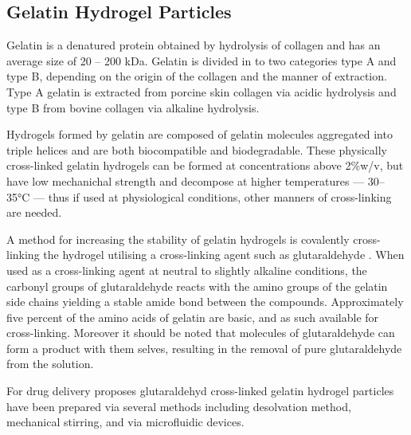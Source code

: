 \subsection{Gelatin Hydrogel Particles}

Gelatin is a denatured protein obtained by hydrolysis of collagen and has an average size of 20 -- 200 kDa. Gelatin is divided in to two categories type A and type B, depending on the origin of the collagen and the manner of extraction. Type A gelatin is extracted from porcine skin collagen via acidic hydrolysis and type B from bovine collagen via alkaline hydrolysis. \parencite{ChangPreparationAndChar2014, Hong2020ProteinBasedNanoparticles,Xing2014IncreasingMechanicalStrength}

Hydrogels formed by gelatin are composed of gelatin molecules aggregated into triple helices and are both biocompatible and biodegradable. These physically cross-linked gelatin hydrogels can be formed at concentrations above 2\%w/v, but have low mechanichal strength and decompose at higher temperatures --- 30--35\si{\degreeCelsius} --- thus if used at physiological conditions, other manners of cross-linking are needed. \parencite{ChangPreparationAndChar2014, Hong2020ProteinBasedNanoparticles,Xing2014IncreasingMechanicalStrength}

A method for increasing the stability of gelatin hydrogels is covalently cross-linking the hydrogel utilising a cross-linking agent such as glutaraldehyde \parencite{Hong2020ProteinBasedNanoparticles,Xing2014IncreasingMechanicalStrength}.
When used as a cross-linking agent at neutral to slightly alkaline conditions, the carbonyl groups of glutaraldehyde reacts with the amino groups of the gelatin side chains yielding a stable amide bond between the compounds. Approximately five percent of the amino acids of gelatin are basic, and as such available for cross-linking. Moreover it should be noted that molecules of glutaraldehyde can form a product with them selves, resulting in the removal of pure glutaraldehyde from the solution. 
\parencite{ChangPreparationAndChar2014, Farris2010AlternativeRecationMechanism} 


For drug delivery proposes glutaraldehyd cross-linked gelatin hydrogel particles have been prepared via several methods including desolvation method\parencite{Hong2020ProteinBasedNanoparticles}, mechanical stirring\parencite{Cascone2002GelatinNanoparticlesWOemul}, and via microfluidic devices\parencite{Zhang2019GelatinCages}.  
\newpage


    